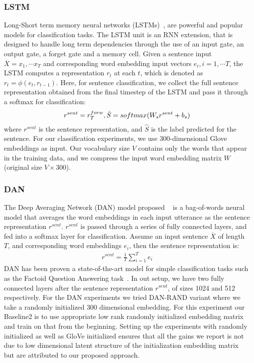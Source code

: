 \subsubsection{LSTM}
Long-Short term memory neural networks (LSTMs)~\cite{hochreiter_lstm}, are powerful and popular models for classification tasks. The LSTM unit is an RNN extension, that is designed to handle long term dependencies through the use of an input gate, an output gate, a forget gate and a memory cell. Given a sentence input $\overline{X}=x_1, \cdots x_T $ and corresponding word embedding input vectors $e_i, i=1, \cdots T$, the LSTM computes a representation $r_t$ at each $t$, which is denoted as $r_t = \phi ( e_t ,r_{t-1} )$. Here, for sentence classification, we collect the full sentence representation obtained from the final timestep of the LSTM and pass it through a softmax for classification:
\begin{gather}
r^{sent} = r^{forw}_{T}, \space  
\hat{S}=softmax( W_{s} r^{sent} + b_{s})
\end{gather}
where $r^{sent}$ is the sentence representation, and $\hat{S}$ is the label predicted for the sentence. For our classification experiments, we use 300-dimensional Glove ~\cite{pennington2014glove} embeddings as input. Our vocabulary size $V$ contains only the words that appear in the training data, and we compress the input word embedding matrix $W$ (original size $V \times 300$).
\subsubsection{DAN}
The Deep Averaging Network (DAN) model proposed ~\cite{iyyer2015deep} is a bag-of-words neural model that averages the word embeddings in each input utterance as the sentence representation $r^{sent}$. $r^{sent}$ is passed through a series of fully connected layers, and fed into a softmax layer for classification. Assume an input sentence  $\overline{X}$ of length $T$, and corresponding word embeddings $e_i$, then the sentence representation is:  
\begin{gather}
r^{sent} = \frac{1}{T} \sum_{i=1}^T { e_i }
\end{gather}
DAN has been proven a state-of-the-art model for simple classification tasks such as the Factoid Question Answering task~\cite{iyyer2015deep}. In out setup, we have two fully connected layers after the sentence representation $r^{sent}$, of sizes 1024 and 512 respectively. For the DAN experiments we tried DAN-RAND \cite{iyyer2015deep} variant where we take a randomly initialized 300 dimensional embedding. For this experiment our Baseline2 is to use appropriate low rank randomly initialized embedding matrix and train on that from the beginning. Setting up the experiments with randomly initialized as well as GloVe initialized ensures that all the gains we report is not due to low dimensional latent structure of the initialization embedding matrix but are attributed to our proposed approach. 
